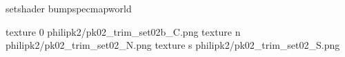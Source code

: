 setshader bumpspecmapworld

texture 0 philipk2/pk02_trim_set02b_C.png
texture n philipk2/pk02_trim_set02_N.png
texture s philipk2/pk02_trim_set02_S.png

